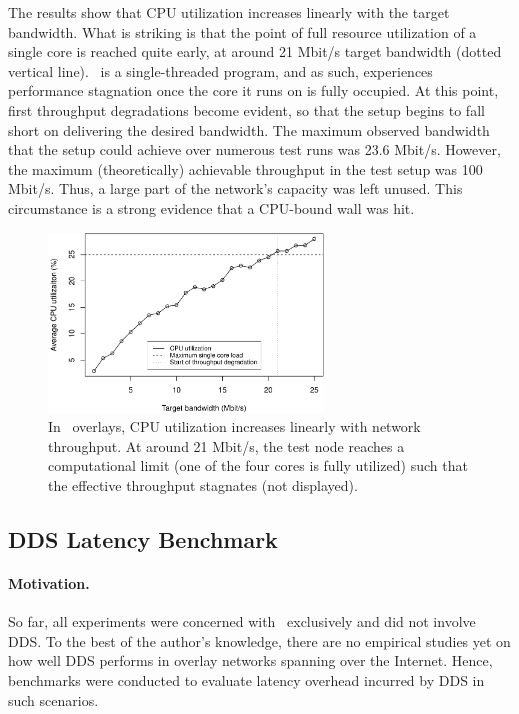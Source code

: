 The results show that CPU utilization increases linearly with the target bandwidth. What is striking is that the point of full resource utilization of a single core is reached quite early, at around 21 Mbit/s target bandwidth (dotted vertical line). \wnet\ is a single-threaded program, and as such, experiences performance stagnation once the core it runs on is fully occupied. At this point, first throughput degradations become evident, so that the setup begins to fall short on delivering the desired bandwidth. The maximum observed bandwidth that the setup could achieve over numerous test runs was 23.6 Mbit/s.
However, the maximum (theoretically) achievable throughput in the test setup was 100 Mbit/s. Thus, a large part of the network's capacity was left unused. This circumstance is a strong evidence that a CPU-bound wall was hit.

\begin{figure}[htpb]
  \centering
  \includegraphics[width=0.65\textwidth]{figures/cpu}
  \caption[\weave\ CPU utilization test results]{In \weave\ overlays, CPU utilization increases linearly with network throughput. At around 21 Mbit/s, the test node reaches a computational limit (one of the four cores is fully utilized) such that the effective throughput stagnates (not displayed).}\label{fig:cpu}
\end{figure}
%
%
%
%
%
%
%
%
%
%
\subsection{DDS Latency Benchmark} \label{sec:ddslatency}

\paragraph{Motivation.} So far, all experiments were concerned with \wnet\ exclusively and did not involve DDS. To the best of the author's knowledge, there are no empirical studies yet on how well DDS performs in overlay networks spanning over the Internet. Hence, benchmarks were conducted to evaluate latency overhead incurred by DDS in such scenarios.

